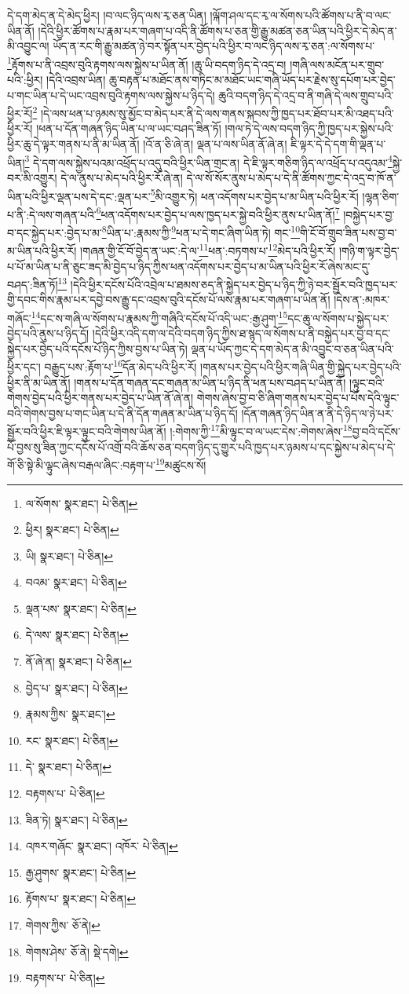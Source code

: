དེ་དག་མེད་ན་དེ་མེད་ཕྱིར། །བ་ལང་ཉིད་ལས་རྭ་ཅན་ཡིན། །ལྐོག་ཤལ་དང་རྭ་ལ་སོགས་པའི་ཚོགས་པ་ནི་བ་ལང་ཡིན་ནོ། །དེའི་ཕྱིར་ཚོགས་པ་རྣམ་པར་གཞག་པ་འདི་ནི་ཚོགས་པ་ཅན་གྱི་རྒྱུ་མཚན་ཅན་ཡིན་པའི་ཕྱིར་དེ་མེད་ན་མི་འབྱུང་ལ། ཡོད་ན་རང་གི་རྒྱུ་མཚན་ཉེ་བར་སྟོན་པར་བྱེད་པའི་ཕྱིར་བ་ལང་ཉིད་ལས་རྭ་ཅན་:ལ་སོགས་པ་\footnote{ལ་སོགས་  སྣར་ཐང་།  པེ་ཅིན། }རྟོགས་པ་ནི་འབྲས་བུའི་རྟགས་ལས་སྐྱེས་པ་ཡིན་ནོ། །ཆུ་ཡི་བདག་ཉིད་དེ་འདྲ་བ། །གཞི་ལས་མངོན་པར་གྲུབ་པའི་:ཕྱིར། །དེའི་འབྲས་ཡིན། ཆུ་བརྟན་པ་མཐོང་ནས་གཏིང་མ་མཐོང་ཡང་གཞི་ཡོད་པར་རྗེས་སུ་དཔོག་པར་བྱེད་པ་གང་ཡིན་པ་དེ་ཡང་འབྲས་བུའི་རྟགས་ལས་སྐྱེས་པ་ཉིད་དེ། ཆུའི་བདག་ཉིད་དེ་འདྲ་བ་ནི་གཞི་དེ་ལས་གྲུབ་པའི་ཕྱིར་རོ།\footnote{ཕྱིར།  སྣར་ཐང་།  པེ་ཅིན། } །དེ་ལས་ཕན་པ་ཉམས་སུ་མྱོང་བ་མེད་པར་ནི་དེ་ལས་གནས་སྐབས་ཀྱི་ཁྱད་པར་ཐོབ་པར་མི་འཐད་པའི་ཕྱིར་རོ། །ཕན་པ་དོན་གཞན་ཉིད་ཡིན་པ་ལ་ཡང་བཤད་ཟིན་ཏོ། །གལ་ཏེ་དེ་ལས་བདག་ཉིད་ཀྱི་ཁྱད་པར་སྐྱེས་པའི་ཕྱིར་ཆུ་དེ་ལྟར་གནས་པ་ནི་མ་ཡིན་ནོ། །འོ་ན་ཅི་ཞེ་ན། ལྡན་པ་ལས་ཡིན་ནོ་ཞེ་ན། ཇི་ལྟར་དེ་དེ་དག་གི་ལྡན་པ་ཡིན།\footnote{ཡི།  སྣར་ཐང་།  པེ་ཅིན། } དེ་དག་ལས་སྐྱེས་པའམ་འཕྲོད་པ་འདུ་བའི་ཕྱིར་ཡིན་གྲང་ན། དེ་ཇི་ལྟར་གཅིག་ཉིད་ལ་འཕྲོད་པ་འདུའམ་\footnote{བའམ་  སྣར་ཐང་།  པེ་ཅིན། }སྐྱེ་བར་མི་འགྱུར། དེ་ལ་ནུས་པ་མེད་པའི་ཕྱིར་རོ་ཞེ་ན། དེ་ལ་སོ་སོར་ནུས་པ་མེད་པ་དེ་ནི་ཚོགས་ཀྱང་དེ་འདྲ་བ་ཁོ་ན་ཡིན་པའི་ཕྱིར་ལྡན་པས་དེ་དང་:ལྡན་པར་\footnote{ལྡན་པས་  སྣར་ཐང་།  པེ་ཅིན། }མི་འགྱུར་ཏེ། ཕན་འདོགས་པར་བྱེད་པ་མ་ཡིན་པའི་ཕྱིར་རོ། །ལྷན་ཅིག་པ་ནི་:དེ་ལས་གཞན་པའི་\footnote{དེ་ལས་  སྣར་ཐང་།  པེ་ཅིན། }ཕན་འདོགས་པར་བྱེད་པ་ལས་ཁྱད་པར་སྐྱེ་བའི་ཕྱིར་ནུས་པ་ཡིན་ནོ།\footnote{ནོ་ཞེ་ན།  སྣར་ཐང་།  པེ་ཅིན། } །བསྐྱེད་པར་བྱ་བ་དང་སྐྱེད་པར་:བྱེད་པ་མ་\footnote{བྱེད་པ་  སྣར་ཐང་།  པེ་ཅིན། }ཡིན་པ་:རྣམས་ཀྱི་\footnote{རྣམས་ཀྱིས་  སྣར་ཐང་། }ཕན་པ་དེ་གང་ཞིག་ཡིན་ཏེ། གང་\footnote{རང་  སྣར་ཐང་།  པེ་ཅིན། }གི་ངོ་བོ་གྲུབ་ཟིན་པས་བྱ་བ་མ་ཡིན་པའི་ཕྱིར་རོ། །གཞན་གྱི་ངོ་བོ་བྱེད་ན་ཡང་:དེ་ལ་\footnote{དེ་  སྣར་ཐང་།  པེ་ཅིན། }ཕན་:བཏགས་པ་\footnote{བརྟགས་པ་  པེ་ཅིན། }མེད་པའི་ཕྱིར་རོ། །གཉི་ག་ལྟར་བྱེད་པ་པོ་མ་ཡིན་པ་ནི་ཅུང་ཟད་མི་བྱེད་པ་ཉིད་ཀྱིས་ཕན་འདོགས་པར་བྱེད་པ་མ་ཡིན་པའི་ཕྱིར་རོ་ཞེས་མང་དུ་བཤད་:ཟིན་ཏོ།\footnote{ཟིན་ཏེ།  སྣར་ཐང་།  པེ་ཅིན། } །དེའི་ཕྱིར་དངོས་པོའི་འབྲེལ་པ་ཐམས་ཅད་ནི་སྐྱེད་པར་བྱེད་པ་ཉིད་ཀྱི་ཉེ་བར་སྦྱོར་བའི་ཁྱད་པར་གྱི་དབང་གིས་རྣམ་པར་དབྱེ་བས་རྒྱུ་དང་འབྲས་བུའི་དངོས་པོ་ལས་རྣམ་པར་གཞག་པ་ཡིན་ནོ། །དེས་ན་:མཁར་གཞོང་\footnote{འཁར་གཞོང་  སྣར་ཐང་། འཁོར་  པེ་ཅིན། }དང་ས་གཞི་ལ་སོགས་པ་རྣམས་ཀྱི་གཞིའི་དངོས་པོ་འདི་ཡང་:རྒྱ་ཤུག་\footnote{རྒྱ་ཤུགས་  སྣར་ཐང་།  པེ་ཅིན། }དང་ཆུ་ལ་སོགས་པ་སྐྱེད་པར་བྱེད་པའི་ནུས་པ་ཉིད་དོ། །དེའི་ཕྱིར་འདི་དག་ལ་དེའི་བདག་ཉིད་ཀྱིས་ཐ་སྙད་ལ་སོགས་པ་ནི་བསྐྱེད་པར་བྱ་བ་དང་སྐྱེད་པར་བྱེད་པའི་དངོས་པོ་ཉིད་ཀྱིས་བྱས་པ་ཡིན་ཏེ། ལྡན་པ་ཡོད་ཀྱང་དེ་དག་མེད་ན་མི་འབྱུང་བ་ཅན་ཡིན་པའི་ཕྱིར་དང་། བརྒྱུད་པས་:རྟོག་པ་\footnote{རྟོགས་པ་  སྣར་ཐང་།  པེ་ཅིན། }དོན་མེད་པའི་ཕྱིར་རོ། །གནས་པར་བྱེད་པའི་ཕྱིར་གཞི་ཡིན་གྱི་སྐྱེད་པར་བྱེད་པའི་ཕྱིར་ནི་མ་ཡིན་ནོ། །གནས་པ་དོན་གཞན་དང་གཞན་མ་ཡིན་པ་ཉིད་ནི་ཕན་པས་བཤད་པ་ཡིན་ནོ། །ལྟུང་བའི་གེགས་བྱེད་པའི་ཕྱིར་གནས་པར་བྱེད་པ་ཡིན་ནོ་ཞེ་ན། གེགས་ཞེས་བྱ་བ་ཅི་ཞིག་གནས་པར་བྱེད་པ་པོས་དེའི་ལྟུང་བའི་གེགས་བྱས་པ་གང་ཡིན་པ་དེ་ནི་དོན་གཞན་མ་ཡིན་པ་ཉིད་དོ། །དོན་གཞན་ཉིད་ཡིན་ན་ནི་དེ་ཉིད་ལ་ཉེ་པར་སྦྱོར་བའི་ཕྱིར་ཇི་ལྟར་ལྟུང་བའི་གེགས་ཡིན་ནོ། །:གེགས་ཀྱི་\footnote{གེགས་ཀྱིས་  ཅོ་ནེ། }མི་ལྟུང་བ་ལ་ཡང་དེས་:གེགས་ཞེས་\footnote{གེགས་ཤེས་  ཅོ་ནེ།  སྡེ་དགེ། }བྱ་བའི་དངོས་པོ་བྱས་སུ་ཟིན་ཀྱང་དངོས་པོ་འགྲོ་བའི་ཆོས་ཅན་བདག་ཉིད་དུ་གྱུར་པའི་ཁྱད་པར་ཉམས་པ་དང་སྐྱེས་པ་མེད་པ་དེ་གོ་ཅི་སྟེ་མི་ལྟུང་ཞེས་བརྒལ་ཞིང་:བརྟག་པ་\footnote{བརྟགས་པ་  པེ་ཅིན། }མཚུངས་སོ། 